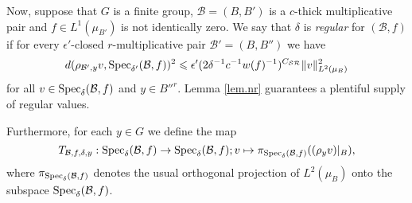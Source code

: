 \documentclass[12pt]{amsart}
\numberwithin{equation}{section}
\theoremstyle{plain}
\theoremstyle{definition}
\renewcommand{\leq}{\leqslant}
\providecommand{\Spec}{\mathop{\rm Spec}\nolimits}
\begin{document}
Now, suppose that $G$ is a finite group, $\mathcal{B}=(B,B')$ is a $c$-thick multiplicative pair and $f \in L^1(\mu_{B'})$ is not identically zero.  We say that $\delta$ is \emph{regular} for $(\mathcal{B},f)$ if for every $\epsilon'$-closed $r$-multiplicative pair $\mathcal{B}'=(B,B'')$ we have
\begin{equation*}
d(\rho_{\mathcal{B}',y}v,\Spec_{\delta'}(\mathcal{B},f))^2 \leq \epsilon'(2\delta^{-1}c^{-1}w(f)^{-1})^{C_{\mathcal{S}\mathcal{R}}}\|v\|_{L^2(\mu_B)}^2
\end{equation*}
for all $v \in \Spec_{\delta}(\mathcal{B},f)$ and $y \in B''^r$.  Lemma \ref{lem.nr} guarantees a plentiful supply of regular values.

Furthermore, for each $y \in G$ we define the map
\begin{equation*}
T_{\mathcal{B},f,\delta,y}:\Spec_\delta(\mathcal{B},f) \rightarrow \Spec_\delta(\mathcal{B},f); v \mapsto \pi_{\Spec_{\delta}(\mathcal{B},f)}((\rho_yv)|_B),
\end{equation*}
where $\pi_{\Spec_{\delta}(\mathcal{B},f)}$ denotes the usual orthogonal projection of $L^2(\mu_B)$ onto the subspace $\Spec_{\delta}(\mathcal{B},f)$.
\end{document}
